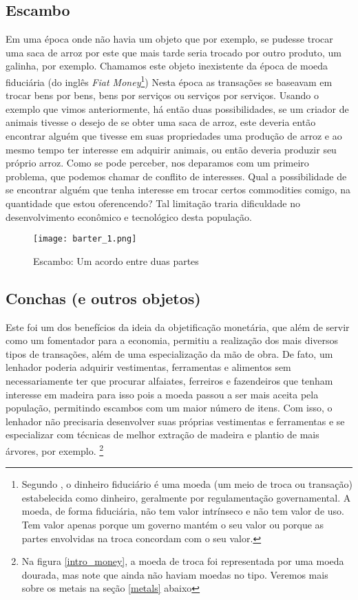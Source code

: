 \subsection{Escambo}

Em uma época onde não havia um objeto que por exemplo, se pudesse trocar uma saca de arroz por este que mais tarde seria trocado por outro produto, um galinha, por exemplo. Chamamos este objeto inexistente da época de moeda fiduciária (do inglês \textit{Fiat Money}\footnote{\label{fiat} Segundo \cite{GOLDBERG}, o dinheiro fiduciário é uma moeda (um meio de troca ou transação) estabelecida como dinheiro, geralmente por regulamentação governamental. A moeda, de forma fiduciária, não tem valor intrínseco e não tem valor de uso. Tem valor apenas porque um governo mantém o seu valor ou porque as partes envolvidas na troca concordam com o seu valor.}) Nesta época as transações se baseavam em trocar bens por bens, bens por serviços ou serviços por serviços. Usando o exemplo que vimos anteriormente, há então duas possibilidades, se um criador de animais tivesse o desejo de se obter uma saca de arroz, este deveria então encontrar alguém que tivesse em suas propriedades uma produção de arroz e ao mesmo tempo ter interesse em adquirir animais, ou então deveria produzir seu próprio arroz. Como se pode perceber, nos deparamos com um primeiro problema, que podemos chamar de conflito de interesses. Qual a possibilidade de se encontrar alguém que tenha interesse em trocar certos commodities comigo, na quantidade que estou oferencendo? Tal limitação traria dificuldade no desenvolvimento econômico e tecnológico desta população. 

\begin{figure}[H]
	\centering
	\caption{Escambo: Um acordo entre duas partes}
	\texttt{[image: barter\_1.png]}
	\\
\end{figure}

\subsection{Conchas (e outros objetos)}
Este foi um dos benefícios da ideia da objetificação monetária, que além de servir como um fomentador para a economia, permitiu a realização  dos mais diversos tipos de transações, além de uma especialização da mão de obra. De fato, um lenhador poderia adquirir vestimentas, ferramentas e alimentos sem necessariamente ter que procurar alfaiates, ferreiros e fazendeiros que tenham interesse em madeira para isso pois a moeda passou a ser mais aceita pela população, permitindo escambos com um maior número de itens. Com isso, o lenhador não precisaria desenvolver suas próprias vestimentas e ferramentas e se especializar com técnicas de melhor extração de madeira e plantio de mais árvores, por exemplo. \footnote{Na figura \ref{intro_money}, a moeda de troca foi representada por uma moeda dourada, mas note que ainda não haviam moedas no tipo.  Veremos mais sobre os metais na seção \ref{metals} abaixo}


